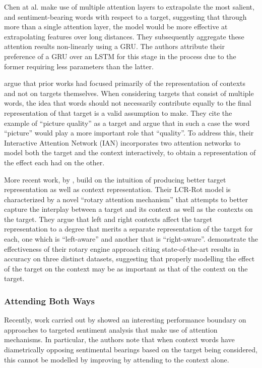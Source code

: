 \documentclass[../../fyp.tex]{subfiles}
\begin{document}
Chen at al. \cite{chen2017} make use of multiple attention layers to extrapolate the most salient, and sentiment-bearing words with respect to a target, suggesting that through more than a single attention layer, the model would be more effective at extrapolating features over long distances. They subsequently aggregate these attention results non-linearly using a GRU. The authors attribute their preference of a GRU over an LSTM for this stage in the process due to the former requiring less parameters than the latter.

\citet{dehongma2017} argue that prior works had focused primarily of the representation of contexts and not on targets themselves. When considering targets that consist of multiple words, the idea that words should not necessarily contribute equally to the final representation of that target is a valid assumption to make. They cite the example of \enquote{picture quality} as a target and argue that in such a case the word \enquote{picture} would play a more important role that \enquote{quality}. To address this, their Interactive Attention Network (IAN) incorporates two attention networks to model both the target and the context interactively, to obtain a representation of the effect each had on the other.

More recent work, by \citet{zheng2018}, build on the intuition of producing better target representation as well as context representation. Their LCR-Rot model is characterized by a novel \enquote{rotary attention mechanism} that attempts to better capture the interplay between a target and its context as well as the contexts on the target. They argue that left and right contexts affect the target representation to a degree that merits a separate representation of the target for each, one which is \enquote{left-aware} and another that is \enquote{right-aware}. \citet{zheng2018} demonstrate the effectiveness of their rotary engine approach citing state-of-the-art results in accuracy on three distinct datasets, suggesting that properly modelling the effect of the target on the context may be as important as that of the context on the target.

\subsubsection{Attending Both Ways}
Recently, work carried out by \citet{wang2018} showed an interesting performance boundary on approaches to targeted sentiment analysis that make use of attention mechanisms. In particular, the authors note that when context words have diametrically opposing sentimental bearings based on the target being considered, this cannot be modelled by improving by attending to the context alone.
\end{document}
